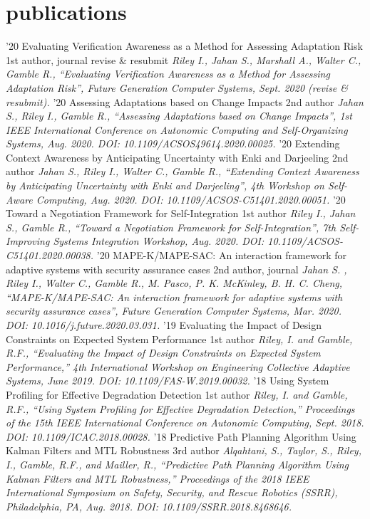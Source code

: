 \documentclass[print]{friggeri-cv}
\begin{document}
  \section{publications}

    \begin{entrylist}
      \entry
        {'20}
        {Evaluating Verification Awareness as a Method for Assessing Adaptation Risk}
        {1st author, journal revise \& resubmit}
        {\textit{Riley I., Jahan S., Marshall A., Walter C., Gamble R., “Evaluating Verification Awareness as a Method for Assessing Adaptation Risk”, Future Generation Computer Systems, Sept. 2020 (revise \& resubmit).}}
      \entry
        {'20}
        {Assessing Adaptations based on Change Impacts}
        {2nd author}
        {\textit{Jahan S., Riley I., Gamble R., “Assessing Adaptations based on Change Impacts”, 1st IEEE International Conference on Autonomic Computing and Self-Organizing Systems, Aug. 2020. DOI: 10.1109/ACSOS49614.2020.00025.}}
      \entry
        {'20}
        {Extending Context Awareness by Anticipating Uncertainty with Enki and Darjeeling}
        {2nd author}
        {\textit{Jahan S., Riley I., Walter C., Gamble R., “Extending Context Awareness by Anticipating Uncertainty with Enki and Darjeeling”,  4th Workshop on Self-Aware Computing, Aug. 2020. DOI: 10.1109/ACSOS-C51401.2020.00051.}}
      \entry
        {'20}
        {Toward a Negotiation Framework for Self-Integration}
        {1st author}
        {\textit{Riley I., Jahan S., Gamble R., “Toward a Negotiation Framework for Self-Integration”, 7th Self-Improving Systems Integration Workshop, Aug. 2020. DOI: 10.1109/ACSOS-C51401.2020.00038.}}
      \entry
        {'20}
        {MAPE-K/MAPE-SAC: An interaction framework for adaptive systems with security assurance cases}
        {2nd author, journal}
        {\textit{Jahan S. , Riley I., Walter C., Gamble R., M. Pasco, P. K. McKinley, B. H. C. Cheng, “MAPE-K/MAPE-SAC: An interaction framework for adaptive systems with security assurance cases”, Future Generation Computer Systems, Mar. 2020. DOI: 10.1016/j.future.2020.03.031.}}
      \entry
        {'19}
        {Evaluating the Impact of Design Constraints on Expected System Performance}
        {1st author}
        {\textit{Riley, I. and Gamble, R.F., “Evaluating the Impact of Design Constraints on Expected System Performance,” 4th International Workshop on Engineering Collective Adaptive Systems, June 2019. DOI: 10.1109/FAS-W.2019.00032.}}
      \entry
        {'18}
        {Using System Profiling for Effective Degradation Detection}
        {1st author}
        {\textit{Riley, I. and Gamble, R.F., “Using System Profiling for Effective Degradation Detection,” Proceedings of the 15th IEEE International Conference on Autonomic Computing, Sept. 2018. DOI: 10.1109/ICAC.2018.00028.}}
      \entry
        {'18}
        {Predictive Path Planning Algorithm Using Kalman Filters and MTL Robustness}
        {3rd author}
        {\textit{Alqahtani, S., Taylor, S., Riley, I., Gamble, R.F., and Mailler, R., “Predictive Path Planning Algorithm Using Kalman Filters and MTL Robustness,” Proceedings of the 2018 IEEE International Symposium on Safety, Security, and Rescue Robotics (SSRR), Philadelphia, PA, Aug. 2018. DOI: 10.1109/SSRR.2018.8468646.}}


\end{entrylist}
\end{document}
